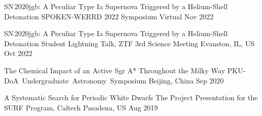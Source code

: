 


\begin{cventries}
	

	\cventry
	{SN\,2020jgb: A Peculiar Type Ia Supernova Triggered by a Helium-Shell Detonation} %
	{SPOKEN-WERRD 2022 Symposium} %
	{Virtual} %
	{Nov 2022} %
	{}

	\cventry
	{SN\,2020jgb: A Peculiar Type Ia Supernova Triggered by a Helium-Shell Detonation} %
	{Student Lightning Talk, ZTF 3rd Science Meeting} %
	{Evanston, IL, US} %
	{Oct 2022} %
	{}
	
	\cventry
	{The Chemical Impact of an Active Sgr A* Throughout the Milky Way} %
	{PKU-DoA Undergraduate Astronomy Symposium} %
	{Beijing, China} %
	{Sep 2020} %
	{}

	\cventry
	{A Systematic Search for Periodic White Dwarfs} %
	{The Project Presentation for the SURF Program, Caltech} %
	{Pasadena, US} %
	{Aug 2019} %
	{}

\end{cventries}